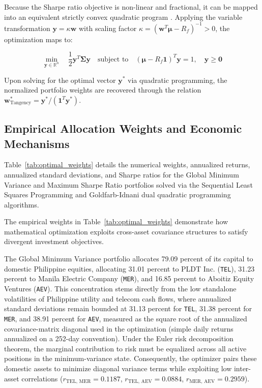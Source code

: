 Because the Sharpe ratio objective is non-linear and fractional, it can be mapped into an equivalent strictly convex quadratic program \parencite{sharpe1964}. Applying the variable transformation $\mathbf{y} = \kappa \mathbf{w}$ with scaling factor $\kappa = (\mathbf{w}^T \boldsymbol{\mu} - R_f)^{-1} > 0$, the optimization maps to:

\begin{equation}
  \min_{\mathbf{y} \in \mathbb{R}^n} \quad \frac{1}{2} \mathbf{y}^T \boldsymbol{\Sigma} \mathbf{y} \quad \text{subject to} \quad (\boldsymbol{\mu} - R_f \mathbf{1})^T \mathbf{y} = 1, \quad \mathbf{y} \ge \mathbf{0}
\end{equation}

Upon solving for the optimal vector $\mathbf{y}^*$ via quadratic programming, the normalized portfolio weights are recovered through the relation $\mathbf{w}_{\text{Tangency}}^* = \mathbf{y}^* / (\mathbf{1}^T \mathbf{y}^*)$.

\subsection{Empirical Allocation Weights and Economic Mechanisms}

Table~\ref{tab:optimal_weights} details the numerical weights, annualized returns, annualized standard deviations, and Sharpe ratios for the Global Minimum Variance and Maximum Sharpe Ratio portfolios solved via the Sequential Least Squares Programming and Goldfarb-Idnani dual quadratic programming algorithms.



The empirical weights in Table~\ref{tab:optimal_weights} demonstrate how mathematical optimization exploits cross-asset covariance structures to satisfy divergent investment objectives.

The Global Minimum Variance portfolio allocates 79.09 percent of its capital to domestic Philippine equities, allocating 31.01 percent to PLDT Inc. (\texttt{TEL}), 31.23 percent to Manila Electric Company (\texttt{MER}), and 16.85 percent to Aboitiz Equity Ventures (\texttt{AEV}). This concentration stems directly from the low standalone volatilities of Philippine utility and telecom cash flows, where annualized standard deviations remain bounded at 31.13 percent for \texttt{TEL}, 31.38 percent for \texttt{MER}, and 38.91 percent for \texttt{AEV}, measured as the square root of the annualized covariance-matrix diagonal used in the optimization (simple daily returns annualized on a 252-day convention). Under the Euler risk decomposition theorem, the marginal contribution to risk must be equalized across all active positions in the minimum-variance state. Consequently, the optimizer pairs these domestic assets to minimize diagonal variance terms while exploiting low inter-asset correlations ($r_{\text{TEL, MER}} = 0.1187$, $r_{\text{TEL, AEV}} = 0.0884$, $r_{\text{MER, AEV}} = 0.2959$).

